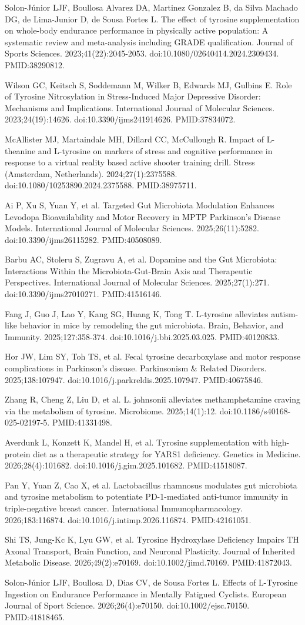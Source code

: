 \documentclass[11pt,oneside]{book}
\newcommand{\refend}{\endgroup\par}
\newcommand{\reff}[2]{\par\hangindent=7mm\hangafter=1\noindent[#1]\hspace{2mm}#2\par}
\begin{document}
\reff{21}{Solon-Júnior LJF, Boullosa Alvarez DA, Martinez Gonzalez B, da Silva Machado DG, de Lima-Junior D, de Sousa Fortes L. The effect of tyrosine supplementation on whole-body endurance performance in physically active population: A systematic review and meta-analysis including GRADE qualification. Journal of Sports Sciences. 2023;41(22):2045-2053. doi:10.1080/02640414.2024.2309434. PMID:38290812.}
\reff{22}{Wilson GC, Keitsch S, Soddemann M, Wilker B, Edwards MJ, Gulbins E. Role of Tyrosine Nitrosylation in Stress-Induced Major Depressive Disorder: Mechanisms and Implications. International Journal of Molecular Sciences. 2023;24(19):14626. doi:10.3390/ijms241914626. PMID:37834072.}
\reff{23}{McAllister MJ, Martaindale MH, Dillard CC, McCullough R. Impact of L-theanine and L-tyrosine on markers of stress and cognitive performance in response to a virtual reality based active shooter training drill. Stress (Amsterdam, Netherlands). 2024;27(1):2375588. doi:10.1080/10253890.2024.2375588. PMID:38975711.}
\reff{24}{Ai P, Xu S, Yuan Y, et al. Targeted Gut Microbiota Modulation Enhances Levodopa Bioavailability and Motor Recovery in MPTP Parkinson's Disease Models. International Journal of Molecular Sciences. 2025;26(11):5282. doi:10.3390/ijms26115282. PMID:40508089.}
\reff{25}{Barbu AC, Stoleru S, Zugravu A, et al. Dopamine and the Gut Microbiota: Interactions Within the Microbiota-Gut-Brain Axis and Therapeutic Perspectives. International Journal of Molecular Sciences. 2025;27(1):271. doi:10.3390/ijms27010271. PMID:41516146.}
\reff{26}{Fang J, Guo J, Lao Y, Kang SG, Huang K, Tong T. L-tyrosine alleviates autism-like behavior in mice by remodeling the gut microbiota. Brain, Behavior, and Immunity. 2025;127:358-374. doi:10.1016/j.bbi.2025.03.025. PMID:40120833.}
\reff{27}{Hor JW, Lim SY, Toh TS, et al. Fecal tyrosine decarboxylase and motor response complications in Parkinson's disease. Parkinsonism \& Related Disorders. 2025;138:107947. doi:10.1016/j.parkreldis.2025.107947. PMID:40675846.}
\reff{28}{Zhang R, Cheng Z, Liu D, et al. L. johnsonii alleviates methamphetamine craving via the metabolism of tyrosine. Microbiome. 2025;14(1):12. doi:10.1186/s40168-025-02197-5. PMID:41331498.}
\reff{29}{Averdunk L, Konzett K, Mandel H, et al. Tyrosine supplementation with high-protein diet as a therapeutic strategy for YARS1 deficiency. Genetics in Medicine. 2026;28(4):101682. doi:10.1016/j.gim.2025.101682. PMID:41518087.}
\reff{30}{Pan Y, Yuan Z, Cao X, et al. Lactobacillus rhamnosus modulates gut microbiota and tyrosine metabolism to potentiate PD-1-mediated anti-tumor immunity in triple-negative breast cancer. International Immunopharmacology. 2026;183:116874. doi:10.1016/j.intimp.2026.116874. PMID:42161051.}
\reff{31}{Shi TS, Jung-Kc K, Lyu GW, et al. Tyrosine Hydroxylase Deficiency Impairs TH Axonal Transport, Brain Function, and Neuronal Plasticity. Journal of Inherited Metabolic Disease. 2026;49(2):e70169. doi:10.1002/jimd.70169. PMID:41872043.}
\reff{32}{Solon-Júnior LJF, Boullosa D, Dias CV, de Sousa Fortes L. Effects of L-Tyrosine Ingestion on Endurance Performance in Mentally Fatigued Cyclists. European Journal of Sport Science. 2026;26(4):e70150. doi:10.1002/ejsc.70150. PMID:41818465.}
\refend
\end{document}

